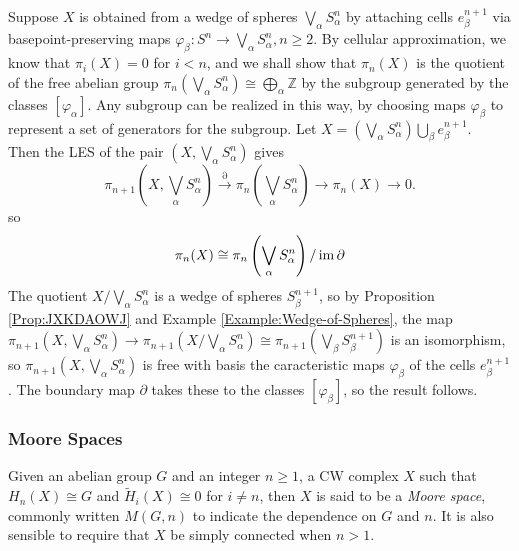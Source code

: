 \begin{example}\label{Example:DJISI02}
    Suppose $X$ is obtained from a wedge of
    spheres $\bigvee_{\alpha} S_{\alpha}^{n}$ by
    attaching cells $e_{\beta}^{n+1}$ via
    basepoint-preserving maps
    $\varphi_{\beta} \colon S^{n} \to 
    \bigvee_{\alpha} S_{\alpha}^{n}, n\ge 2$.
    By cellular approximation, we know that
    $\pi_i (X) = 0$ for $i < n$, and we shall show
    that $\pi_n(X)$ is the quotient of the free
    abelian group
    $\pi_n \left( \bigvee_{\alpha} S_{\alpha}^{n} \right) 
    \cong \bigoplus_{\alpha} \mathbb{Z}$ by
    the subgroup generated by the
    classes $\left[ \varphi_{\alpha} \right] $.
    Any subgroup can be realized in this way, by
    choosing maps $\varphi_{\beta}$ to represent a 
    set of generators for the subgroup.
    Let 
    $X = \left( \bigvee_{\alpha}S_{\alpha}^{n} \right) 
    \bigcup_{\beta } e_{\beta}^{n+1}$.\\
    Then the LES of the pair
    $\left( X, \bigvee_{\alpha} S_{\alpha}^{n} \right) $ gives
    \[
    \pi_{n+1}\left( X, \bigvee_{\alpha}S_{\alpha}^{n} \right) 
    \stackrel{\partial}{\to} \pi_n \left( \bigvee_{\alpha}
    S_{\alpha}^{n} \right) \to 
    \pi_n (X) \to 0.
    \] 
    so 
    \[
    \pi_n (X) \cong \pi_n \left( \bigvee_{\alpha}S_{\alpha}^{n}
    \right) / \operatorname{im} \partial
    \] 
    The quotient
    $X / \bigvee_{\alpha} S_{\alpha}^{n}$ is a wedge
    of spheres $S_{\beta}^{n+1}$, so by Proposition
    \ref{Prop:JXKDAOWJ} and Example \ref{Example:Wedge-of-Spheres},
    the map
     $\pi_{n+1} \left( X, \bigvee_{\alpha}S_{\alpha}^{n} \right) 
     \to \pi_{n+1} \left( X / \bigvee_{\alpha}S_{\alpha}^{n} \right) 
     \cong \pi_{n+1} \left( \bigvee_{\beta}
     S_{\beta}^{n+1} \right) $ 
     is an isomorphism, so
     $\pi_{n+1}\left( X, \bigvee_{\alpha}S_{\alpha}^{n} \right) $ 
     is free with basis the caracteristic
     maps $\varphi_{\beta}$ of the cells $e_{\beta}^{n+1}$.
     The boundary map $\partial$ takes
     these to the classes
     $\left[ \varphi_{\beta} \right] $, so
     the result follows.

\end{example}


\newpage

\subsubsection{Moore Spaces}

\begin{definition}
    Given an abelian group $G$ and an integer $n\ge 1$,
    a CW complex $X$ such that
    $H_n(X) \cong G$ and $\tilde{H}_i(X) \cong 0$ for
    $i\neq n$, then $X$ is said to be a \textit{Moore space},
    commonly written $M(G,n)$ to indicate the
    dependence on $G$ and $n$. It is
    also sensible to require that $X$ be simply connected when
    $n>1$.
\end{definition}

